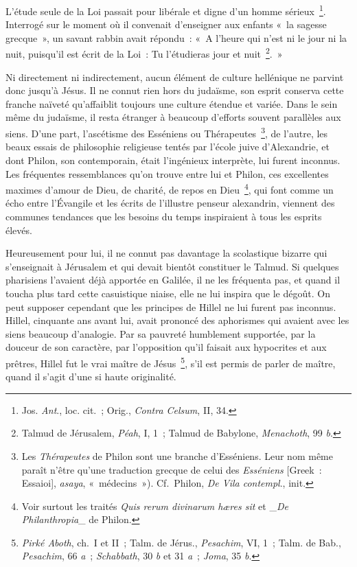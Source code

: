 \documentclass[french,twoside]{book} %
\begin{document}
L’étude seule de la Loi passait pour libérale et digne d’un homme sérieux \footnote{ Jos. {\itshape Ant}., loc. cit. ; Orig., {\itshape Contra Celsum}, II, 34.}. Interrogé sur le moment où il convenait d’enseigner aux enfants « la sagesse grecque », un savant rabbin avait répondu : « A l’heure qui n’est ni le jour ni la nuit, puisqu’il est écrit de la Loi : Tu l’étudieras jour et nuit \footnote{ Talmud de Jérusalem, {\itshape Péah}, I, 1 ; Talmud de Babylone, {\itshape Menachoth}, 99 {\itshape b}.}. »\par
Ni directement ni indirectement, aucun élément de culture hellénique ne parvint donc jusqu’à Jésus. Il ne connut rien hors du judaïsme, son esprit conserva cette franche naïveté qu’affaiblit toujours une culture étendue et variée. Dans le sein même du judaïsme, il resta étranger à beaucoup d’efforts souvent parallèles aux siens. D’une part, l’ascétisme des Esséniens ou Thérapeutes \footnote{ Les {\itshape Thérapeutes} de Philon sont une branche d’Esséniens. Leur nom même paraît n’être qu’une traduction grecque de celui des {\itshape Esséniens} [Greek : Essaioi], {\itshape asaya}, « médecins »). Cf. Philon, {\itshape De Vila contempl}., init.}, de l’autre, les beaux essais de philosophie religieuse tentés par l’école juive d’Alexandrie, et dont Philon, son contemporain, était l’ingénieux interprète, lui furent inconnus. Les fréquentes ressemblances qu’on trouve entre lui et Philon, ces excellentes maximes d’amour de Dieu, de charité, de repos en Dieu \footnote{ Voir surtout les traités {\itshape Quis rerum divinarum hæres sit} et \_{\itshape De Philanthropia}\_ de Philon.}, qui font comme un écho entre l’Évangile et les écrits de l’illustre penseur alexandrin, viennent des communes tendances que les besoins du temps inspiraient à tous les esprits élevés.\par
Heureusement pour lui, il ne connut pas davantage la scolastique bizarre qui s’enseignait à Jérusalem et qui devait bientôt constituer le Talmud. Si quelques pharisiens l’avaient déjà apportée en Galilée, il ne les fréquenta pas, et quand il toucha plus tard cette casuistique niaise, elle ne lui inspira que le dégoût. On peut supposer cependant que les principes de Hillel ne lui furent pas inconnus. Hillel, cinquante ans avant lui, avait prononcé des aphorismes qui avaient avec les siens beaucoup d’analogie. Par sa pauvreté humblement supportée, par la douceur de son caractère, par l’opposition qu’il faisait aux hypocrites et aux prêtres, Hillel fut le vrai maître de Jésus \footnote{{\itshape Pirké Aboth}, ch. I et II ; Talm. de Jérus., {\itshape Pesachim}, VI, 1 ; Talm. de Bab., {\itshape Pesachim}, 66 {\itshape a} ; {\itshape Schabbath}, 30 {\itshape b} et 31 {\itshape a} ; {\itshape Joma}, 35 {\itshape b}.}, s’il est permis de parler de maître, quand il s’agit d’une si haute originalité.\par
\end{document}
